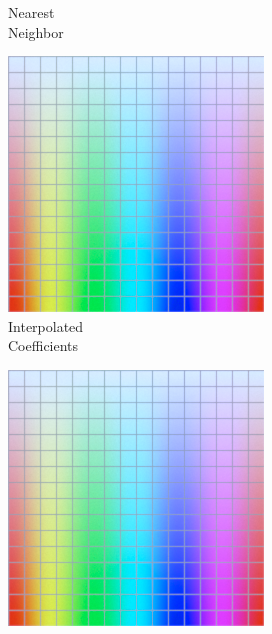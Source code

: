 \begin{figure}[t]
\begin{subfigure}[t]{0.22\textwidth}
		\caption{Nearest\\Neighbor}
		\label{fig:sigUpliftNearestNeighbor}
	\end{subfigure} \hspace{0.1em}
	\begin{subfigure}[t]{0.22\textwidth}
		\includegraphics[width=\linewidth]{img/upsampling_texture_interpCoeff.png}
		\caption{Interpolated\\Coefficients}
		\label{fig:sigUpliftInterpCoeff}
	\end{subfigure} \hspace{0.1em}
	\begin{subfigure}[t]{0.22\textwidth}
		\includegraphics[width=\linewidth]{img/upsampling_texture_interpSpectra.png}

\end{subfigure}
\end{figure}
